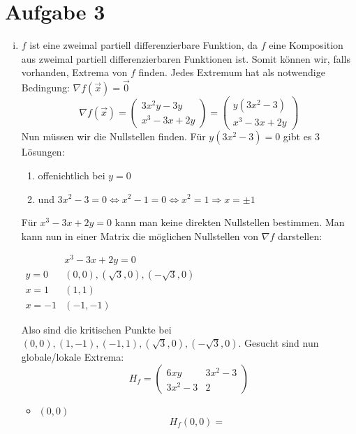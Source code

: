 \documentclass[10pt,a4paper,parskip=half]{scrartcl}
\begin{document}
\section*{Aufgabe 3}
\begin{enumerate}[(i)]
	\item 	\(f\) ist eine zweimal partiell differenzierbare Funktion, da \(f\) eine Komposition aus zweimal partiell differenzierbaren Funktionen ist. Somit können wir, falls vorhanden, Extrema von $f$ finden. Jedes Extremum hat als notwendige Bedingung: $\nabla f(\vec x) = \vec 0$
	\[ \nabla f (\vec x) = 
	\begin{pmatrix}
		3x^2y - 3y \\
		x^3 - 3x + 2y 
	\end{pmatrix} =  
	\begin{pmatrix}
		y(3x^2 - 3) \\
		x^3 - 3x + 2y 
	\end{pmatrix}  \]
Nun müssen wir die Nullstellen finden.
Für \( y(3x^2 -3) = 0 \) gibt es 3 Lösungen:
\begin{enumerate}
	\item offenichtlich bei $y = 0$
	\item  und \(3x^2 - 3 = 0 \Leftrightarrow x^2 - 1 = 0 \Leftrightarrow x^2 = 1 \Rightarrow x = \pm 1\)
\end{enumerate}
Für \( x^3 - 3x + 2y  = 0 \) kann man keine direkten Nullstellen bestimmen.
Man kann nun in einer Matrix die möglichen Nullstellen von $\nabla f$ darstellen: \\
\begin{center}
\begin{math}
	\begin{array}{c|cc}
	 & x^3 - 3x + 2y  = 0  \\
	 \hline
	 y = 0 & (0,0),(\sqrt{3},0),(-\sqrt{3},0)\\
	 x = 1 & (1,1)\\
	 x = -1 & (-1,-1)
	\end{array}
\end{math}
\end{center}
Also sind die kritischen Punkte bei $(0,0), (1,-1),(-1,1),(\sqrt{3},0),(-\sqrt{3},0)$. Gesucht sind nun globale/lokale Extrema:
	\[H_f = 
	\begin{pmatrix}
		6xy & 3x^2 - 3 \\
		3x^2 - 3 & 2	
	\end{pmatrix} \]
	\begin{itemize}
		\item 	$(0,0)$
			\[H_f(0,0) = 
\]
\end{itemize}
\end{enumerate}
\end{document}
